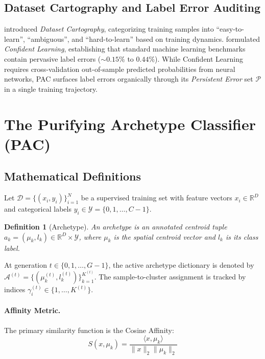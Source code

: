 \documentclass[11pt,a4paper]{article}
\newtheorem{definition}{Definition}
\begin{document}
\subsection{Dataset Cartography and Label Error Auditing}
\citet{swayamdipta2020dataset} introduced \textit{Dataset Cartography}, categorizing training samples into ``easy-to-learn'', ``ambiguous'', and ``hard-to-learn'' based on training dynamics. \citet{northcutt2021confident} formulated \textit{Confident Learning}, establishing that standard machine learning benchmarks contain pervasive label errors ($\sim 0.15\%$ to $0.44\%$). While Confident Learning requires cross-validation out-of-sample predicted probabilities from neural networks, PAC surfaces label errors organically through its \textit{Persistent Error} set $\mathcal{P}$ in a single training trajectory.

\section{The Purifying Archetype Classifier (PAC)}
\label{sec:method}

\subsection{Mathematical Definitions}

Let $\mathcal{D} = \{(x_i, y_i)\}_{i=1}^N$ be a supervised training set with feature vectors $x_i \in \mathbb{R}^D$ and categorical labels $y_i \in \mathcal{Y} = \{0, 1, \dots, C-1\}$.

\begin{definition}[Archetype]
An archetype is an annotated centroid tuple $a_k = (\mu_k, l_k) \in \mathbb{R}^D \times \mathcal{Y}$, where $\mu_k$ is the spatial centroid vector and $l_k$ is its class label.
\end{definition}

At generation $t \in \{0, 1, \dots, G-1\}$, the active archetype dictionary is denoted by $\mathcal{A}^{(t)} = \{(\mu_k^{(t)}, l_k^{(t)})\}_{k=1}^{K^{(t)}}$. The sample-to-cluster assignment is tracked by indices $\gamma_i^{(t)} \in \{1, \dots, K^{(t)}\}$.

\paragraph{Affinity Metric.} The primary similarity function is the Cosine Affinity:
\begin{equation}
    S(x, \mu_k) = \frac{\langle x, \mu_k \rangle}{\|x\|_2 \|\mu_k\|_2}
\end{equation}
\end{document}
